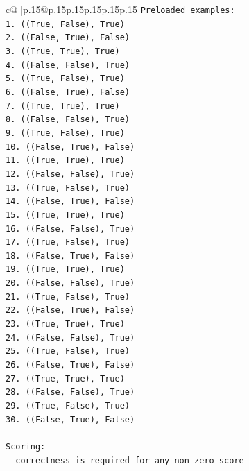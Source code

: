 \documentclass{article}
\begin{document}
{\begin{supertabular}{c@{$\;$}|p{.15\linewidth}@{}p{.15\linewidth}p{.15\linewidth}p{.15\linewidth}p{.15\linewidth}p{.15\linewidth}}
{{{\texttt{Preloaded examples:} \\
\texttt{1. ((True, False), True)} \\
\texttt{2. ((False, True), False)} \\
\texttt{3. ((True, True), True)} \\
\texttt{4. ((False, False), True)} \\
\texttt{5. ((True, False), True)} \\
\texttt{6. ((False, True), False)} \\
\texttt{7. ((True, True), True)} \\
\texttt{8. ((False, False), True)} \\
\texttt{9. ((True, False), True)} \\
\texttt{10. ((False, True), False)} \\
\texttt{11. ((True, True), True)} \\
\texttt{12. ((False, False), True)} \\
\texttt{13. ((True, False), True)} \\
\texttt{14. ((False, True), False)} \\
\texttt{15. ((True, True), True)} \\
\texttt{16. ((False, False), True)} \\
\texttt{17. ((True, False), True)} \\
\texttt{18. ((False, True), False)} \\
\texttt{19. ((True, True), True)} \\
\texttt{20. ((False, False), True)} \\
\texttt{21. ((True, False), True)} \\
\texttt{22. ((False, True), False)} \\
\texttt{23. ((True, True), True)} \\
\texttt{24. ((False, False), True)} \\
\texttt{25. ((True, False), True)} \\
\texttt{26. ((False, True), False)} \\
\texttt{27. ((True, True), True)} \\
\texttt{28. ((False, False), True)} \\
\texttt{29. ((True, False), True)} \\
\texttt{30. ((False, True), False)} \\
\\ 
\texttt{Scoring:} \\
\texttt{{-} correctness is required for any non{-}zero score} \\
}}}
\end{supertabular}}
\end{document}
